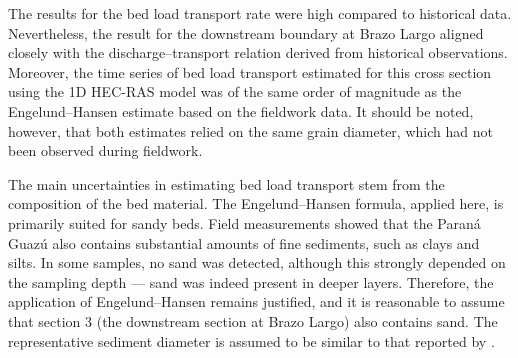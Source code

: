 The results for the bed load transport rate were high compared to historical data. Nevertheless, the result for the downstream boundary at Brazo Largo aligned closely with the discharge–transport relation derived from historical observations. Moreover, the time series of bed load transport estimated for this cross section using the 1D HEC-RAS model was of the same order of magnitude as the Engelund–Hansen estimate based on the fieldwork data. It should be noted, however, that both estimates relied on the same grain diameter, which had not been observed during fieldwork.

The main uncertainties in estimating bed load transport stem from the composition of the bed material. The Engelund–Hansen formula, applied here, is primarily suited for sandy beds. Field measurements showed that the Paraná Guazú also contains substantial amounts of fine sediments, such as clays and silts. In some samples, no sand was detected, although this strongly depended on the sampling depth — sand was indeed present in deeper layers. Therefore, the application of Engelund–Hansen remains justified, and it is reasonable to assume that section 3 (the downstream section at Brazo Largo) also contains sand. The representative sediment diameter is assumed to be similar to that reported by \textcite{reMetodologiaParaGeneracion2009}.

